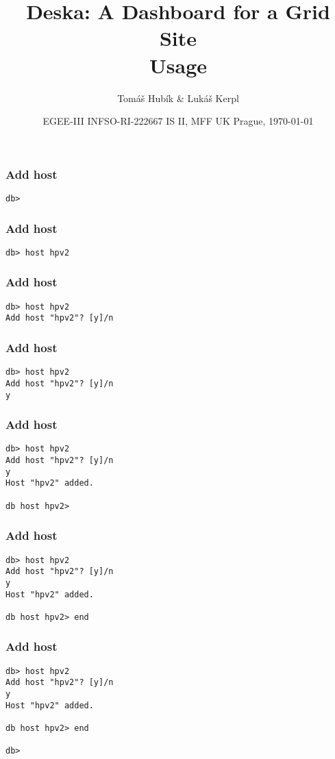 \documentclass{beamer}
\begin{document}
\title{Deska: A Dashboard for a Grid Site\\
Usage}
\author{Tomáš Hubík \& Lukáš Kerpl}
\date{
   {EGEE-III INFSO-RI-222667}  
\hfill
IS II, MFF UK Prague, \today
}
\begin{frame}
\maketitle
\end{frame}

\begin{frame}[fragile]
\frametitle{Add host}
\begin{lstlisting}
db> 
\end{lstlisting}
\end{frame}
\begin{frame}[fragile]
\frametitle{Add host}
\begin{lstlisting}
db> host hpv2
\end{lstlisting}
\end{frame}
\begin{frame}[fragile]
\frametitle{Add host}
\begin{lstlisting}
db> host hpv2
Add host "hpv2"? [y]/n

\end{lstlisting}
\end{frame}
\begin{frame}[fragile]
\frametitle{Add host}
\begin{lstlisting}
db> host hpv2
Add host "hpv2"? [y]/n
y
\end{lstlisting}
\end{frame}
\begin{frame}[fragile]
\frametitle{Add host}
\begin{lstlisting}
db> host hpv2
Add host "hpv2"? [y]/n
y
Host "hpv2" added.

db host hpv2> 

\end{lstlisting}
\end{frame}
\begin{frame}[fragile]
\frametitle{Add host}
\begin{lstlisting}
db> host hpv2
Add host "hpv2"? [y]/n
y
Host "hpv2" added.

db host hpv2> end
\end{lstlisting}
\end{frame}
\begin{frame}[fragile]
\frametitle{Add host}
\begin{lstlisting}
db> host hpv2
Add host "hpv2"? [y]/n
y
Host "hpv2" added.

db host hpv2> end

db> 
\end{lstlisting}
\end{frame}
\end{document}
